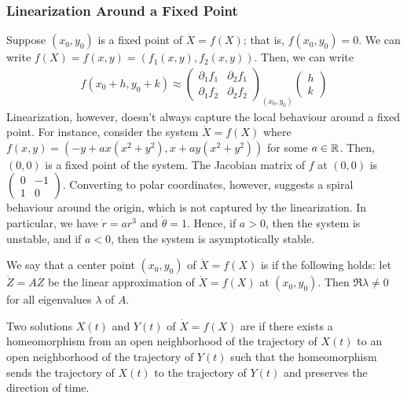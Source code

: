 \subsubsection{Linearization Around a Fixed Point}
Suppose $(x_{0},y_{0})$ is a fixed point of $\dot{X} = f(X)$; that is, $f(x_{0},y_{0}) = 0$. We can write $f(X) = f(x,y) = (f_{1}(x,y), f_{2}(x,y))$. Then, we can write
\begin{align}
    f(x_{0}+h,y_{0}+k) \approx \begin{pmatrix}
        \partial_{1} f_{1} & \partial_{2} f_{1} \\ \partial_{1} f_{2} & \partial_{2} f_{2}
    \end{pmatrix}_{(x_{0},y_{0})} \begin{pmatrix}
        h \\ k
    \end{pmatrix}
\end{align}
Linearization, however, doesn't always capture the local behaviour around a fixed point. For instance, consider the system $\dot{X} = f(X)$ where $f(x,y) = (-y + ax(x^{2}+y^{2}), x + ay (x^{2}+y^{2}))$ for some $a \in \mathbb{R}$. Then, $(0,0)$ is a fixed point of the system. The Jacobian matrix of $f$ at $(0,0)$ is $\begin{pmatrix}
    0 & -1 \\
    1 & 0
\end{pmatrix}$. Converting to polar coordinates, however, suggests a spiral behaviour around the origin, which is not captured by the linearization. In particular, we have $\dot{r} = ar^{3}$ and $\dot{\theta} = 1$. Hence, if $a > 0$, then the system is unstable, and if $a < 0$, then the system is asymptotically stable. 

\begin{definition}
    We say that a center point $(x_{0},y_{0})$ of $\dot{X} = f(X)$ is  if the following holds: let $\dot{Z} = AZ$ be the linear approximation of $\dot{X} = f(X)$ at $(x_{0},y_{0})$. Then $\Re \lambda \neq 0$ for all eigenvalues $\lambda$ of $A$.
\end{definition}

\begin{definition}
    Two solutions $X(t)$ and $Y(t)$ of $\dot{X} = f(X)$ are  if there exists a homeomorphism from an open neighborhood of the trajectory of $X(t)$ to an open neighborhood of the trajectory of $Y(t)$ such that the homeomorphism sends the trajectory of $X(t)$ to the trajectory of $Y(t)$ and preserves the direction of time.
\end{definition}

